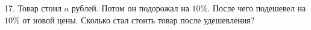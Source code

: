 17. Товар стоил $a$ рублей. Потом он подорожал на $10\%.$ После чего подешевел на $10\%$ от новой цены. Сколько стал стоить товар после удешевления?\\
